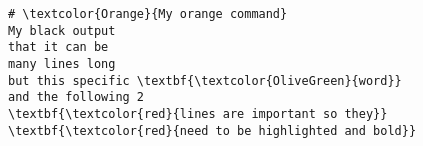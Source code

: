\documentclass[a4paper,10pt]{article}
\begin{document}
   \begin{Verbatim}[label={Code sample}]
# \textcolor{Orange}{My orange command}
My black output
that it can be
many lines long
but this specific \textbf{\textcolor{OliveGreen}{word}}
and the following 2
\textbf{\textcolor{red}{lines are important so they}}
\textbf{\textcolor{red}{need to be highlighted and bold}}
   \end{Verbatim}
\end{document}
